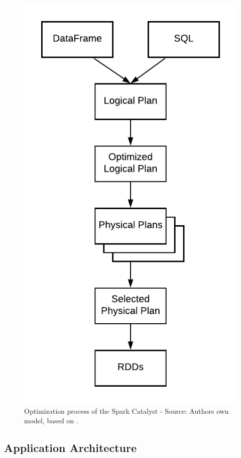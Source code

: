 \begin{figure}[h]
\centering
\includegraphics[scale=1]{images/04_technical_background/spark/catalyst_optimization_process}
\caption{Optimization process of the Spark Catalyst - Source: Authors own model, based on \cite{Hien2018Spark}.}
\label{fig:04_spark_pr-model_catalyst_process}
\end{figure}


\subsection{Application Architecture}
\label{subsec:04_spark_architecture}

